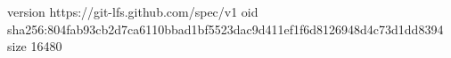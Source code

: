 version https://git-lfs.github.com/spec/v1
oid sha256:804fab93cb2d7ca6110bbad1bf5523dac9d411ef1f6d8126948d4c73d1dd8394
size 16480
